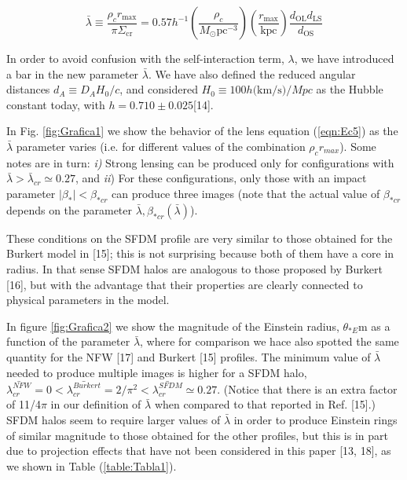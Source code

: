 \documentclass[9.5pt, twocolumn]{article}
\begin{document}
\begin{equation}
\bar{\lambda} \equiv \frac{\rho_{c} r_{\max }}{\pi \Sigma_{\mathrm{cr}}}=0.57 h^{-1}\left(\frac{\rho_{c}}{M_{\odot} \mathrm{pc}^{-3}}\right)\left(\frac{r_{\mathrm{max}}}{\mathrm{kpc}}\right) \frac{d_{\mathrm{OL}} d_{\mathrm{LS}}}{d_{\mathrm{OS}}}
\label{eq:Ec6}
\end{equation}

In order to avoid confusion with the self-interaction term, $\lambda$, we have introduced a bar in the new parameter $\bar{\lambda}$. We have also defined the reduced angular distances $d_A\equiv D_AH_0/c$, and considered $H_0\equiv 100h\text{(km/s)}/Mpc$ as the Hubble constant today, with $h=0.710 \pm 0.025$[14].

In Fig. \ref{fig:Grafica1} we show the behavior of the lens equation (\ref{eqn:Ec5})
as the $\bar{\lambda}$ parameter varies (i.e. for different values of the
combination $\rho_cr_{max}$). Some notes are in turn: \textit{i)} Strong
lensing can be produced only for configurations with $\bar{\lambda}>\bar{\lambda}_{cr}\simeq 0.27$, and \textit{ii}) For these configurations, only those with an impact parameter $|\beta_*|<\beta_{*cr}$ can produce three images (note that the actual value of $\beta_{*cr}$ depends on the parameter $\bar{\lambda}, \beta_{*cr}(\bar{\lambda})$).

These conditions on the SFDM profile are very similar
to those obtained for the Burkert model in [15]; this is not
surprising because both of them have a core in radius. In
that sense SFDM halos are analogous to those proposed
by Burkert [16], but with the advantage that their properties
are clearly connected to physical parameters in the
model.

In figure \ref{fig:Grafica2} we show the magnitude of the Einstein radius, $\theta_{*E}$m as a function of the parameter $\bar{\lambda}$, where for comparison we hace also spotted the same quantity for the NFW [17] and Burkert [15] profiles. The minimum value of $\bar{\lambda}$ needed to produce multiple images is higher for a SFDM halo, $\bar{\lambda_{cr}^{NFW}}=0<\bar{\lambda_{cr}^{Burkert}}=2/\pi^2<\bar{\lambda_{cr}^{SFDM}}\simeq 0.27$. (Notice that there is an extra factor of 11/4$\pi$ in our definition of $\bar{\lambda}$ when compared to that reported in Ref. [15].) SFDM halos seem to require larger values of $\bar{\lambda}$ in order to produce Einstein rings of similar magnitude
to those obtained for the other profiles, but this is in part
due to projection effects that have not been considered
in this paper [13, 18], as we shown in Table (\ref{table:Tabla1}).
\end{document}
